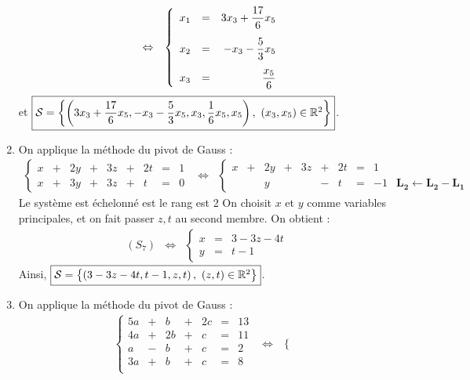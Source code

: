 \documentclass[a4paper, 11pt,reqno]{article}
\begin{document}
\begin{correction}
\begin{enumerate}
$$\begin{array}{rcl}
& \Leftrightarrow &
\left\lbrace\begin{array}{rcrcrcrcrcrl}
x_1 & = &\ddp 3x_3+\ddp\frac{17}{6}x_5\vsec\\
x_2 & = &\ddp -x_3-\ddp\frac{5}{3}x_5 \vsec\\
x_3  & = &\ddp \frac{x_5}{6}\\
\end{array}\right.
\end{array}$$
 et $\fbox{$ \mathcal{S}=\left\lbrace \left( 3x_3+\ddp\frac{17}{6}x_5, -x_3-\ddp\frac{5}{3}x_5,x_3,\ddp\frac{1}{6}x_5,x_5  \right),\ (x_3,x_5)\in\R^2  \right\rbrace $}$.
\item On applique la m\'ethode du pivot de Gauss :
$$\begin{array}{rcl}
\left\lbrace\begin{array}{rcrcrcrcr}
x &+ &2y &+ & 3z &+& 2t& = &1\\
x &+ &3y &+ & 3z &+& t& = &0
\end{array}\right.
& \Leftrightarrow &
\left\lbrace\begin{array}{rcrcrcrcrl}
x &+ &2y &+ & 3z &+& 2t& = &1\\
 & &y & &  &-& t& = &-1& \mathbf{L_2 \leftarrow L_2-L_1}
\end{array}\right.
\end{array}$$
Le syst\`eme est \'echelonn\'e est le rang est 2 On choisit $x$ et $y$ comme variables principales, et on fait passer $z,t$ au second membre. On obtient :
$$\begin{array}{rcl}
(S_7)
& \Leftrightarrow &
\left\lbrace\begin{array}{rcrcrcrcrl}
x & = &3-3z-4t\\
y  & = &t-1
\end{array}\right.
\end{array}$$
Ainsi, $\fbox{$ \mathcal{S}=\left\lbrace \left( 3-3z-4t,t-1,z,t  \right),\ (z,t)\in\R^2  \right\rbrace $}$.
\item On applique la m\'ethode du pivot de Gauss :
$$\begin{array}{rcl}
\left\lbrace\begin{array}{rcrcrcr}
5a &+ &b &+ & 2c & = &13\\
4a &+ &2b &+ & c & = &11\\
a &- &b &+ & c & = &2\\
3a &+ &b &+ & c & = &8\\
\end{array}\right.
& \Leftrightarrow &
\left\lbrace\begin{array}{rcrcrcr}

\end{array}
\end{array}$$
\end{enumerate}
\end{correction}
\end{document}
